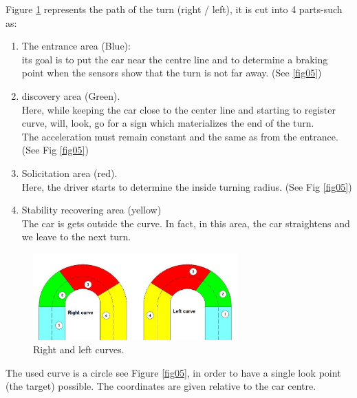 \documentclass{llncs}
\begin{document}
Figure \ref {fig04} represents the path of the turn (right / left), it is cut into 4 parts-such as:
\begin{enumerate}
	\item  The entrance area (Blue):\\
	its goal is to put the car near the centre line and to determine a braking point when the sensors show that the turn is not far away. (See \ref {fig05})
	
	\item discovery area (Green).\\
	Here, while keeping the car close to the center line and starting to register curve, will, look, go for a sign which materializes the end of the turn.\\
	The acceleration must remain constant and the same as from the entrance. (See Fig \ref {fig05})
	\item Solicitation area (red).\\		
	Here, the driver starts to determine the inside turning radius. (See Fig \ref {fig05})
	\item Stability recovering area (yellow)\\
	The car is gets outside the curve. In fact, in this area, the car straightens and we leave to the next turn.
\end{enumerate}
\begin{figure}[h!]
	\centering
	\includegraphics[width=0.7\textwidth]{fig/virage.PNG}
	\begin{minipage}{10cm}
		\centering
		\caption{\footnotesize Right and left curves.}
		\label{fig04}
	\end{minipage} 
	
\end{figure}

The used curve  is a circle see Figure \ref {fig05}, in order to have a single look point (the target) possible.
The coordinates are given relative to the car centre. \\	
\end{document}
